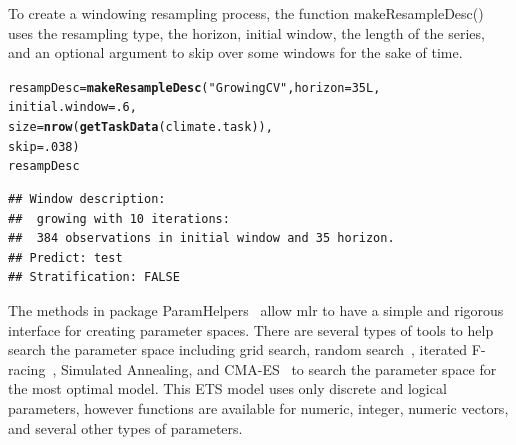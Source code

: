 \documentclass[12pt]{article}\usepackage[]{graphicx}\usepackage[]{color}
\makeatletter
\newcommand{\hlnum}[1]{\textcolor[rgb]{0.686,0.059,0.569}{#1}}%
\newcommand{\hlstr}[1]{\textcolor[rgb]{0.192,0.494,0.8}{#1}}%
\newcommand{\hlstd}[1]{\textcolor[rgb]{0.345,0.345,0.345}{#1}}%
\newcommand{\hlkwb}[1]{\textcolor[rgb]{0.69,0.353,0.396}{#1}}%
\newcommand{\hlkwc}[1]{\textcolor[rgb]{0.333,0.667,0.333}{#1}}%
\newcommand{\hlkwd}[1]{\textcolor[rgb]{0.737,0.353,0.396}{\textbf{#1}}}%
\newenvironment{kframe}{%
 \def\at@end@of@kframe{}%
 \ifinner\ifhmode%
  \def\at@end@of@kframe{\end{minipage}}%
  \begin{minipage}{\columnwidth}%
 \fi\fi%
 \def\FrameCommand##1{\hskip\@totalleftmargin \hskip-\fboxsep
 \colorbox{shadecolor}{##1}\hskip-\fboxsep
     \hskip-\linewidth \hskip-\@totalleftmargin \hskip\columnwidth}%
 \MakeFramed {\advance\hsize-\width
   \@totalleftmargin\z@ \linewidth\hsize
   \@setminipage}}%
 {\par\unskip\endMakeFramed%
 \at@end@of@kframe}
\newenvironment{knitrout}{}{} %
\theoremstyle{definition}
\newcommand\code{\@codex}
\def\@codex#1{{\normalfont\ttfamily\hyphenchar\font=-1 #1}}
\newcommand{\pkg}[1]{{\fontseries{b}\selectfont #1}}
\makeatother
\begin{document}
To create a windowing resampling process, the function \code{makeResampleDesc()} uses the resampling type, the horizon, initial window, the length of the series, and an optional argument to skip over some windows for the sake of time.

\singlespacing
\begin{knitrout}
\color{fgcolor}\begin{kframe}
\begin{alltt}
\hlstd{resampDesc} \hlkwb{=} \hlkwd{makeResampleDesc}\hlstd{(}\hlstr{"GrowingCV"}\hlstd{,} \hlkwc{horizon} \hlstd{=} \hlnum{35L}\hlstd{,}
                          \hlkwc{initial.window} \hlstd{=} \hlnum{.6}\hlstd{,}
                          \hlkwc{size} \hlstd{=} \hlkwd{nrow}\hlstd{(}\hlkwd{getTaskData}\hlstd{(climate.task)),}
                          \hlkwc{skip} \hlstd{=} \hlnum{.038}\hlstd{)}
\hlstd{resampDesc}
\end{alltt}
\begin{verbatim}
## Window description:
##  growing with 10 iterations:
##  384 observations in initial window and 35 horizon.
## Predict: test
## Stratification: FALSE
\end{verbatim}
\end{kframe}
\end{knitrout}
\doublespacing

The methods in package \pkg{ParamHelpers}~\cite{paramhelper} allow \pkg{mlr} to have a simple and rigorous interface for creating parameter spaces. There are several types of tools to help search the parameter space including grid search, random search~\cite{Bergstra}, iterated F-racing~\cite{irace}, Simulated Annealing, and CMA-ES~\cite{cmaes}  to search the parameter space for the most optimal model. This ETS model uses only discrete and logical parameters, however functions are available for numeric, integer, numeric vectors, and several other types of parameters.
\end{document}
